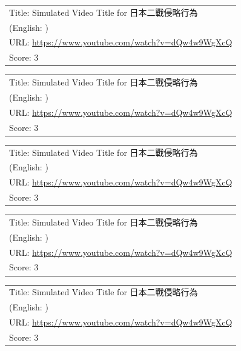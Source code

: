 \documentclass{article}
\begin{document}
\noindent
\begin{tabular}{p{}}
Title: Simulated Video Title for 日本二戰侵略行為 \\
(English: ) \\
URL: \url{https://www.youtube.com/watch?v=dQw4w9WgXcQ} \\
Score: 3 \\
\end{tabular}
\vspace{0.5em}

\noindent
\begin{tabular}{p{}}
Title: Simulated Video Title for 日本二戰侵略行為 \\
(English: ) \\
URL: \url{https://www.youtube.com/watch?v=dQw4w9WgXcQ} \\
Score: 3 \\
\end{tabular}
\vspace{0.5em}

\noindent
\begin{tabular}{p{}}
Title: Simulated Video Title for 日本二戰侵略行為 \\
(English: ) \\
URL: \url{https://www.youtube.com/watch?v=dQw4w9WgXcQ} \\
Score: 3 \\
\end{tabular}
\vspace{0.5em}

\noindent
\begin{tabular}{p{}}
Title: Simulated Video Title for 日本二戰侵略行為 \\
(English: ) \\
URL: \url{https://www.youtube.com/watch?v=dQw4w9WgXcQ} \\
Score: 3 \\
\end{tabular}
\vspace{0.5em}

\noindent
\begin{tabular}{p{}}
Title: Simulated Video Title for 日本二戰侵略行為 \\
(English: ) \\
URL: \url{https://www.youtube.com/watch?v=dQw4w9WgXcQ} \\
Score: 3 \\
\end{tabular}
\vspace{0.5em}
\end{document}
